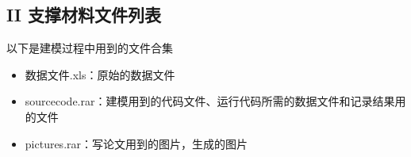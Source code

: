 \documentclass[UTF8]{article}
\begin{document}
	\subsection*{II 支撑材料文件列表}
	以下是建模过程中用到的文件合集
	\begin{itemize}
		\item 数据文件.xls：原始的数据文件
		\item sourcecode.rar：建模用到的代码文件、运行代码所需的数据文件和记录结果用的文件
		\item pictures.rar：写论文用到的图片，生成的图片
	\end{itemize}
\end{document}
